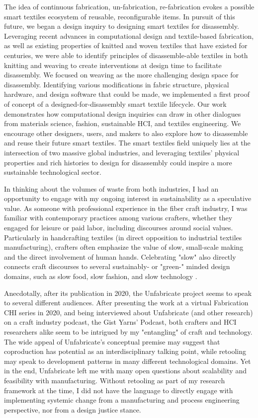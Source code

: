 The idea of continuous fabrication, un-fabrication, re-fabrication evokes a possible smart textiles ecosystem of reusable, reconfigurable items. In pursuit of this future, we began a design inquiry to designing smart textiles for disassembly. Leveraging recent advances in computational design and textile-based fabrication, as well as existing properties of knitted and woven textiles that have existed for centuries, we were able to identify principles of disassemble-able textiles in both knitting and weaving to create interventions at design time to facilitate disassembly. We focused on weaving as the more challenging design space for disassembly. Identifying various modifications in fabric structure, physical hardware, and design software that could be made, we implemented a first proof of concept of a designed-for-disassembly smart textile lifecycle. Our work demonstrates how computational design inquiries can draw in other dialogues from materials science, fashion, sustainable HCI, and textiles engineering. We encourage other designers, users, and makers to also explore how to disassemble and reuse their future smart textiles. The smart textiles field uniquely lies at the intersection of two massive global industries, and leveraging textiles' physical properties and rich histories to design for disassembly could inspire a more sustainable technological sector. 

In thinking about the volumes of waste from both industries, I had an opportunity to engage with my ongoing interest in sustainability as a speculative value. As someone with professional experience in the fiber craft industry, I was familiar with contemporary practices among various crafters, whether they engaged for leisure or paid labor, including discourses around social values. Particularly in handcrafting textiles (in direct opposition to industrial textiles manufacturing), crafters often emphasize the value of slow, small-scale making and the direct involvement of human hands. Celebrating "slow" also directly connects craft discourses to several sustainably- or "green-" minded design domains, such as slow food, slow fashion, and slow technology \cite{frater_hand-crafted_2018,odom_time_2018,phelan_what_2017}.

Anecdotally, after its publication in 2020, the Unfabricate project seems to speak to several different audiences. After presenting the work at a virtual Fabrication \@ CHI series in 2020, and being interviewed about Unfabricate (and other research) on a craft industry podcast, the Gist Yarns' Podcast, both crafters and HCI researchers alike seem to be intrigued by my "entangling" of craft and technology. The wide appeal of Unfabricate's conceptual premise may suggest that coproduction has potential as an interdisciplinary talking point, while retooling may speak to development patterns in many different technological domains. Yet in the end, Unfabricate left me with many open questions about scalability and feasibility with manufacturing. Without retooling as part of my research framework at the time, I did not have the language to directly engage with implementing systemic change from a manufacturing and process engineering perspective, nor from a design justice stance.